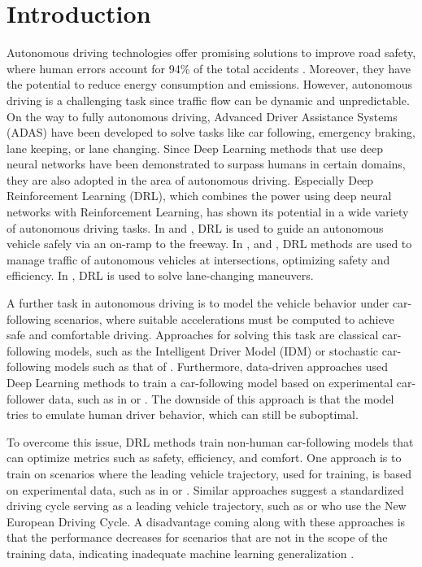 \documentclass[review]{elsarticle}
\providecommand{\3}{{\ss}}
\begin{document}
	
	\section{Introduction}
	Autonomous driving technologies offer promising solutions to
	improve road safety, where human errors account for 94\% of the total
	accidents \citep{vehicleCrashSurvey2015}.  
	Moreover, they have the potential to reduce energy consumption and emissions. 
	However, autonomous driving is a challenging task
	since traffic flow can be dynamic and unpredictable.
	On the way to fully autonomous driving, Advanced Driver Assistance Systems
	(ADAS) have been developed to solve tasks like car following, emergency
	braking, lane keeping, or lane changing. 
	Since Deep Learning methods that use deep neural networks have been demonstrated to surpass humans
	in certain domains, they are also adopted in the area of autonomous
	driving.
	Especially Deep Reinforcement Learning (DRL), which combines the power
	using deep neural networks with Reinforcement Learning, has shown its potential in a wide variety of autonomous driving tasks. 
	In \cite{OnRampMerge2018} and \cite{OnRampMerge2020}, DRL is used to
	guide an autonomous vehicle safely via an on-ramp to the freeway. In \cite{intersection1}, \cite{intersection3} and \cite{intersection2}, DRL methods are used to manage traffic of autonomous vehicles at intersections, optimizing safety and efficiency.
	In \cite{LangeChange1}, DRL is used to solve lane-changing maneuvers.
	
	A further task in autonomous driving is to model the vehicle behavior
	under car-following scenarios, where suitable accelerations must be
	computed to achieve safe and comfortable driving. Approaches
	for solving this task are classical car-following models, such as the
	Intelligent Driver Model (IDM) \citep{Opus} or stochastic car-following
	models such as that of \cite{Treiber2018stochIDM_TRB}. Furthermore, data-driven approaches used Deep Learning methods to train a car-following model based on experimental car-follower data, such as in \cite{Chong2011SimulationOD} or \cite{ZHOU2017245}. The downside of this approach is that the model tries to emulate human driver behavior, which can still be suboptimal.
	
	To overcome this issue, DRL methods train non-human car-following models that can optimize metrics such as safety, efficiency, and comfort. 
	One approach is to train on scenarios where the leading vehicle
	trajectory, used for training, is based on experimental data, such as
	in \cite{SafeEfficientAndComfortable} or
	\cite{HumanLikeAutonomouCF}. Similar approaches suggest a standardized
	driving cycle serving as a leading vehicle trajectory, such
	as \cite{ComparisonRLvsMPC} or \cite{CFelectricVehicle}
	who use the New European Driving Cycle.
	A disadvantage coming along with these approaches is that the
	performance decreases for scenarios that are not in the scope of the training data, indicating inadequate machine learning generalization \citep{ComparisonRLvsMPC}. 
	
\end{document}
